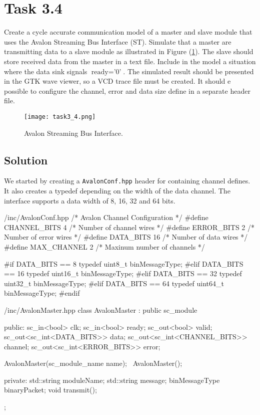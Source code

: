 \documentclass[../main.tex]{subfiles}
\begin{document}
\section{Task 3.4}

Create a cycle accurate communication model of a master and slave module that uses the Avalon Streaming Bus Interface (ST). Simulate that a master are transmitting data to a slave module as illustrated in Figure (\ref{fig:avalon}). The slave should store received data from the master in a text file. Include in the model a situation where the data sink signals $\text{ready} = \text{'0'}$. The simulated result should be presented in the GTK wave viewer, so a VCD trace file must be created. It should e possible to configure the channel, error and data size define in a separate header file.

\begin{figure}[h]
    \centering
    \texttt{[image: task3\_4.png]}
    \caption{Avalon Streaming Bus Interface.}
    \label{fig:avalon}
\end{figure}

\subsection*{Solution}

We started by creating a \texttt{AvalonConf.hpp} header for containing channel defines. It also creates a typedef depending on the width of the data channel. The interface supports a data width of 8, 16, 32 and 64 bits.

\begin{myminted}{/inc/AvalonConf.hpp}
/* Avalon Channel Configuration */
#define CHANNEL_BITS    4   /* Number of channel wires      */
#define ERROR_BITS      2   /* Number of error wires        */
#define DATA_BITS       16  /* Number of data wires         */
#define MAX_CHANNEL     2   /* Maxinum number of channels   */

#if DATA_BITS == 8
typedef uint8_t binMessageType;
#elif DATA_BITS == 16
typedef uint16_t binMessageType;
#elif DATA_BITS == 32
typedef uint32_t binMessageType;
#elif DATA_BITS == 64
typedef uint64_t binMessageType;
#endif
\end{myminted}

\newpage

\begin{myminted}{/inc/AvalonMaster.hpp}
class AvalonMaster : public sc_module {
public:
    sc_in<bool>                     clk;
    sc_in<bool>                     ready;
    sc_out<bool>                    valid;
    sc_out<sc_int<DATA_BITS>>       data;
    sc_out<sc_int<CHANNEL_BITS>>    channel;
    sc_out<sc_int<ERROR_BITS>>      error;

    AvalonMaster(sc_module_name name);
    ~AvalonMaster();

private:
    std::string moduleName;
    std::string message;
    binMessageType binaryPacket;
    void transmit();
};
\end{myminted}
\end{document}
